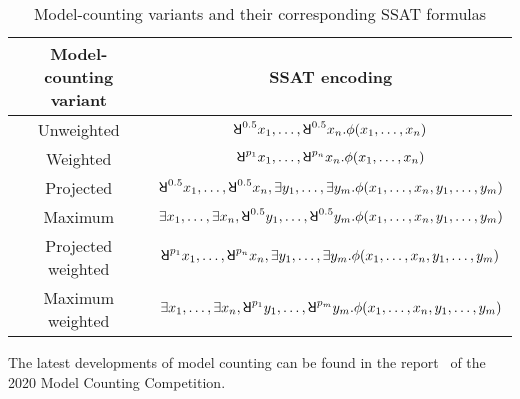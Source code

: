 \begin{table}[t]
    \centering
    \caption{Model-counting variants and their corresponding SSAT formulas}
    \label{tbl:related-work-model-counting}
    \begin{tabular}{c|c}
        Model-counting variant & SSAT encoding                                                                                              \\
        \hline
        Unweighted             & $\random{0.5}x_1,\ldots,\random{0.5}x_n.\pf(x_1,\ldots,x_n)$                                               \\
        Weighted               & $\random{p_1}x_1,\ldots,\random{p_n}x_n.\pf(x_1,\ldots,x_n)$                                               \\
        Projected              & $\random{0.5}x_1,\ldots,\random{0.5}x_n,\exists y_1,\ldots,\exists y_m.\pf(x_1,\ldots,x_n,y_1,\ldots,y_m)$ \\
        Maximum                & $\exists x_1,\ldots,\exists x_n,\random{0.5}y_1,\ldots,\random{0.5}y_m.\pf(x_1,\ldots,x_n,y_1,\ldots,y_m)$ \\
        Projected weighted     & $\random{p_1}x_1,\ldots,\random{p_n}x_n,\exists y_1,\ldots,\exists y_m.\pf(x_1,\ldots,x_n,y_1,\ldots,y_m)$ \\
        Maximum weighted       & $\exists x_1,\ldots,\exists x_n,\random{p_1}y_1,\ldots,\random{p_m}y_m.\pf(x_1,\ldots,x_n,y_1,\ldots,y_m)$ \\
    \end{tabular}
\end{table}

The latest developments of model counting can be found in the report~\cite{MC-COMP2020} of the 2020 Model Counting Competition.